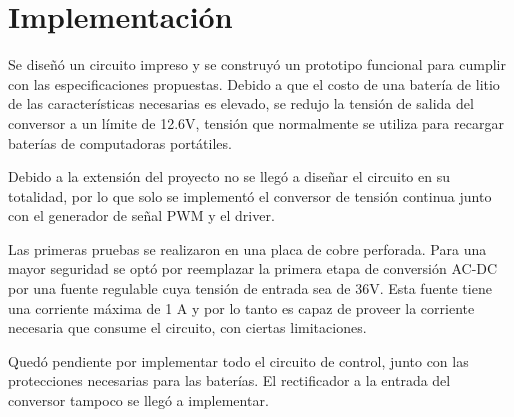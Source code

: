 \section{Implementación}

Se diseñó un circuito impreso y se construyó un prototipo funcional para cumplir con las especificaciones propuestas. 
Debido a que el costo de una batería de litio de las características necesarias es elevado,
se redujo la tensión de salida del conversor a un límite de 12.6V,
tensión que normalmente se utiliza para recargar baterías de computadoras portátiles.

Debido a la extensión del proyecto no se llegó a diseñar el circuito en su totalidad,
por lo que solo se implementó el conversor de tensión continua
junto con el generador de señal PWM y el driver.

Las primeras pruebas se realizaron en una placa de cobre perforada. 
Para una mayor seguridad se optó por reemplazar la primera etapa de conversión AC-DC por una fuente regulable cuya tensión de entrada sea de 36V.
Esta fuente tiene una corriente máxima de 1 A y por lo tanto es capaz de proveer la corriente necesaria que consume el circuito, con ciertas limitaciones.

Quedó pendiente por implementar todo el circuito de control,
junto con las protecciones necesarias para las baterías.
El rectificador a la entrada del conversor tampoco se llegó a implementar.